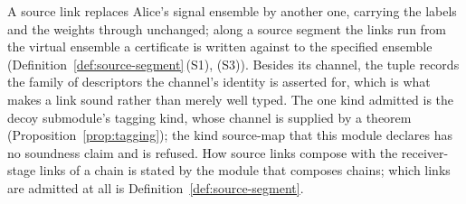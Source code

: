 
A source link replaces Alice's signal ensemble by another one, carrying the
labels and the weights through unchanged; along a source segment the links
run from the virtual ensemble a certificate is written against to the
specified ensemble (Definition~\ref{def:source-segment}\,(S1), (S3)). Besides
its channel, the tuple records the family of descriptors the channel's
identity is asserted for, which is what makes a link sound rather than merely
well typed. The one kind admitted is the decoy submodule's tagging kind, whose
channel is supplied by a theorem (Proposition~\ref{prop:tagging}); the kind
\textsf{source-map} that this module declares has no soundness claim and is
refused. How source links compose with the receiver-stage links of a chain is
stated by the module that composes chains; which links are admitted at all is
Definition~\ref{def:source-segment}.

